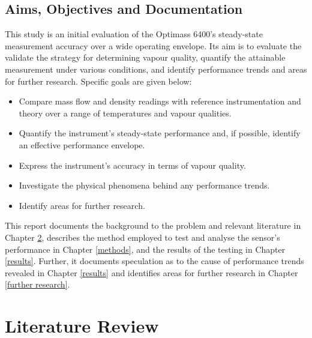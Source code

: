 \documentclass{report}
\begin{document}
\section{Aims, Objectives and Documentation}
This study is an initial evaluation of the Optimass 6400's steady-state measurement accuracy over a wide operating envelope. Its aim is to evaluate the validate the strategy for determining vapour quality, quantify the attainable measurement under various conditions, and identify performance trends and areas for further research. Specific goals are given below:
\begin{itemize}
\item{Compare mass flow and density readings with reference instrumentation and theory over a range of temperatures and vapour qualities.}
\item{Quantify the instrument's steady-state performance and, if possible, identify an effective performance envelope.}
\item{Express the instrument's accuracy in terms of vapour quality.}
\item{Investigate the physical phenomena behind any performance trends.}
\item{Identify areas for further research.}
\end{itemize}
This report documents the background to the problem and relevant literature in Chapter \ref{litReview}, describes the method employed to test and analyse the sensor's performance in Chapter \ref{methods}, and the results of the testing in Chapter \ref{results}. Further, it documents speculation as to the cause of performance trends revealed in Chapter \ref{results} and identifies areas for further research in Chapter \ref{further research}.


\chapter{Literature Review} \label{litReview}
\end{document}
